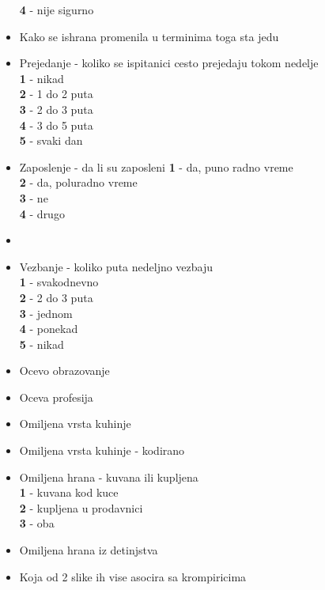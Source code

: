 \documentclass[12pt,a4paper]{article}
\begin{document}
\begin{itemize}
    \textbf{4} - nije sigurno\\
  \item Kako se ishrana promenila u terminima toga sta jedu\\
  \item Prejedanje - koliko se ispitanici cesto prejedaju tokom nedelje\\
    \textbf{1} - nikad\\
    \textbf{2} - 1 do 2 puta\\
    \textbf{3} - 2 do 3 puta\\
    \textbf{4} - 3 do 5 puta\\
    \textbf{5} - svaki dan\\
  \item Zaposlenje - da li su zaposleni
    \textbf{1} - da, puno radno vreme\\
    \textbf{2} - da, poluradno vreme\\
    \textbf{3} - ne\\
    \textbf{4} - drugo\\
  \item 
  \item Vezbanje - koliko puta nedeljno vezbaju\\
    \textbf{1} - svakodnevno\\
    \textbf{2} - 2 do 3 puta\\
    \textbf{3} - jednom\\
    \textbf{4} - ponekad\\
    \textbf{5} - nikad\\
  \item Ocevo obrazovanje\\
  \item Oceva profesija\\
  \item Omiljena vrsta kuhinje\\
  \item Omiljena vrsta kuhinje - kodirano\\
  \item Omiljena hrana - kuvana ili kupljena\\
    \textbf{1} - kuvana kod kuce\\
    \textbf{2} - kupljena u prodavnici\\
    \textbf{3} - oba\\
  \item Omiljena hrana iz detinjstva\\
  \item Koja od 2 slike ih vise asocira sa krompiricima\\

\end{itemize}
\end{document}
